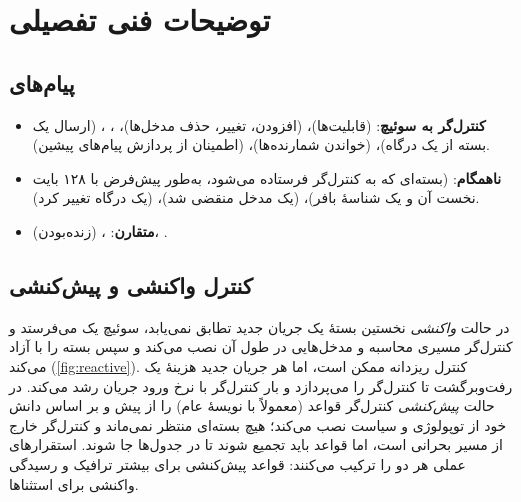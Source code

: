 \documentclass[11pt,a4paper]{article}
\begin{document}
\begin{acnfigure}
  \caption{خط لولهٔ  با چند جدول جریان و فیلدهای یک مدخل جریان.}
  \label{fig:table}
\end{acnfigure}

\section{توضیحات فنی تفصیلی}

\subsection{پیام‌های }
\begin{itemize}
  \item \textbf{کنترل‌گر به سوئیچ}:  (قابلیت‌ها)،  (افزودن، تغییر، حذف مدخل‌ها)، ،
        ،  (ارسال یک بسته از یک درگاه)،  (خواندن شمارنده‌ها)، 
        (اطمینان از پردازش پیام‌های پیشین).
  \item \textbf{ناهمگام}:  (بسته‌ای که به کنترل‌گر فرستاده می‌شود، به‌طور پیش‌فرض با ۱۲۸ بایت نخست آن و یک
        شناسهٔ بافر)،  (یک مدخل منقضی شد)،  (یک درگاه تغییر کرد).
  \item \textbf{متقارن}: ،  (زنده‌بودن)، .
\end{itemize}

\subsection{کنترل واکنشی و پیش‌کنشی}
در حالت \emph{واکنشی} نخستین بستهٔ یک جریان جدید تطابق نمی‌یابد، سوئیچ یک  می‌فرستد و کنترل‌گر مسیری محاسبه و
مدخل‌هایی در طول آن نصب می‌کند و سپس بسته را با  آزاد می‌کند (\cref{fig:reactive}). کنترل ریزدانه ممکن است،
اما هر جریان جدید هزینهٔ یک رفت‌وبرگشت تا کنترل‌گر را می‌پردازد و بار کنترل‌گر با نرخ ورود جریان رشد می‌کند. در حالت
\emph{پیش‌کنشی} کنترل‌گر قواعد (معمولاً با نویسهٔ عام) را از پیش و بر اساس دانش خود از توپولوژی و سیاست نصب می‌کند؛ هیچ بسته‌ای
منتظر نمی‌ماند و کنترل‌گر خارج از مسیر بحرانی است، اما قواعد باید تجمیع شوند تا در جدول‌ها جا شوند. استقرارهای عملی هر دو را
ترکیب می‌کنند: قواعد پیش‌کنشی برای بیشتر ترافیک و رسیدگی واکنشی برای استثناها.

\begin{acnfigure}
  \caption{برقراری واکنشی جریان: عدم تطابق جدول، ،  در طول مسیر، .}
  \label{fig:reactive}
\end{acnfigure}
\end{document}
